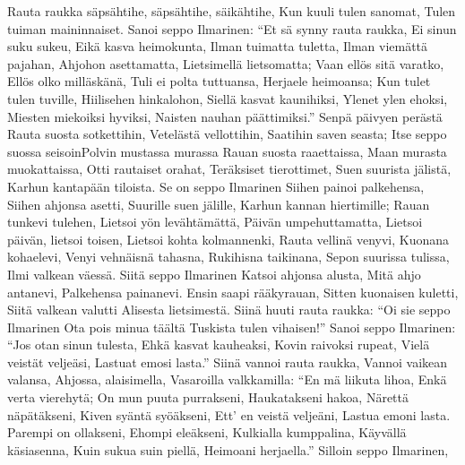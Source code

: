     Rauta raukka säpsähtihe,
    säpsähtihe, säikähtihe,
    Kun kuuli tulen sanomat,
    Tulen tuiman maininnaiset.
  \endverse
  \beginverse
    Sanoi seppo Ilmarinen:
    ``Et sä synny rauta raukka,
    Ei sinun suku sukeu,
    Eikä kasva heimokunta,
    Ilman tuimatta tuletta,
    Ilman viemättä pajahan,
    Ahjohon asettamatta,
    Lietsimellä lietsomatta;
    Vaan ellös sitä varatko,
    Ellös olko milläskänä,
    Tuli ei polta tuttuansa,
    Herjaele heimoansa;
    Kun tulet tulen tuville,
    Hiilisehen hinkalohon,
    Siellä kasvat kaunihiksi,
    Ylenet ylen ehoksi,
    Miesten miekoiksi hyviksi,
    Naisten nauhan päättimiksi.''
  \endverse
  \beginverse
    Senpä päivyen perästä
    Rauta suosta sotkettihin,
    Vetelästä vellottihin,
    Saatihin saven seasta;
    Itse seppo suossa seisoinPolvin mustassa murassa
    Rauan suosta raaettaissa,
    Maan murasta muokattaissa,
    Otti rautaiset orahat,
    Teräksiset tierottimet,
    Suen suurista jälistä,
    Karhun kantapään tiloista.
  \endverse
  \beginverse
    Se on seppo Ilmarinen
    Siihen painoi palkehensa,
    Siihen ahjonsa asetti,
    Suurille suen jälille,
    Karhun kannan hiertimille;
    Rauan tunkevi tulehen,
    Lietsoi yön levähtämättä,
    Päivän umpehuttamatta,
    Lietsoi päivän, lietsoi toisen,
    Lietsoi kohta kolmannenki,
    Rauta vellinä venyvi,
    Kuonana kohaelevi,
    Venyi vehnäisnä tahasna,
    Rukihisna taikinana,
    Sepon suurissa tulissa,
    Ilmi valkean väessä.
  \endverse
  \beginverse
    Siitä seppo Ilmarinen
    Katsoi ahjonsa alusta,
    Mitä ahjo antanevi,
    Palkehensa painanevi.
    Ensin saapi rääkyrauan,
    Sitten kuonaisen kuletti,
    Siitä valkean valutti
    Alisesta lietsimestä.
  \endverse
  \beginverse
    Siinä huuti rauta raukka:
    ``Oi sie seppo Ilmarinen
    Ota pois minua täältä
    Tuskista tulen vihaisen!''
  \endverse
  \beginverse
    Sanoi seppo Ilmarinen:
    ``Jos otan sinun tulesta,
    Ehkä kasvat kauheaksi,
    Kovin raivoksi rupeat,
    Vielä veistät veljeäsi,
    Lastuat emosi lasta.''
  \endverse
  \beginverse
    Siinä vannoi rauta raukka,
    Vannoi vaikean valansa,
    Ahjossa, alaisimella,
    Vasaroilla valkkamilla:
    ``En mä liikuta lihoa,
    Enkä verta vierehytä;
    On mun puuta purrakseni,
    Haukatakseni hakoa,
    Närettä näpätäkseni,
    Kiven syäntä syöäkseni,
    Ett' en veistä veljeäni,
    Lastua emoni lasta.
    Parempi on ollakseni,
    Ehompi eleäkseni,
    Kulkialla kumppalina,
    Käyvällä käsiasenna,
    Kuin sukua suin piellä,
    Heimoani herjaella.''
  \endverse
  \beginverse
    Silloin seppo Ilmarinen,
